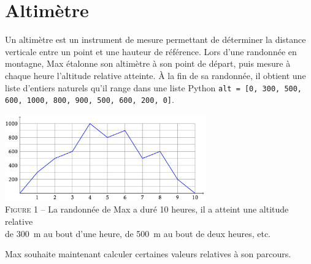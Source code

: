 \documentclass{magnolia}
\begin{document}

\section{Altimètre}
Un altimètre est un instrument de mesure permettant de déterminer la distance verticale entre un
point et une hauteur de référence. Lors d'une randonnée en montagne, Max étalonne son altimètre
à son point de départ, puis mesure à chaque heure l'altitude relative atteinte. À la fin de sa
randonnée, il obtient une liste d'entiers naturels qu'il range dans une liste Python 
\verb!alt = [0, 300, 500, 600, 1000, 800, 900, 500, 600, 200, 0]!. 

\begin{center}
\includegraphics[width=0.65\textwidth]{../../Commun/Images/python-tp-altimetre}\\
\textsc{Figure 1} -- La randonnée de Max a duré 10 heures, il a atteint une
altitude relative\\ de 300~m au bout d'une heure, de 500~m au bout de deux heures, etc.
\end{center}

Max souhaite maintenant calculer certaines valeurs relatives à son parcours.
\end{document}
